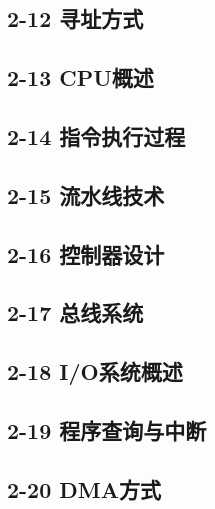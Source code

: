 \documentclass[10pt, aspectratio=169]{beamer}
\begin{document}
\subsection{2-12 寻址方式}


\subsection{2-13 CPU概述}


\subsection{2-14 指令执行过程}


\subsection{2-15 流水线技术}


\subsection{2-16 控制器设计}


\subsection{2-17 总线系统}


\subsection{2-18 I/O系统概述}


\subsection{2-19 程序查询与中断}


\subsection{2-20 DMA方式}

\end{document}
